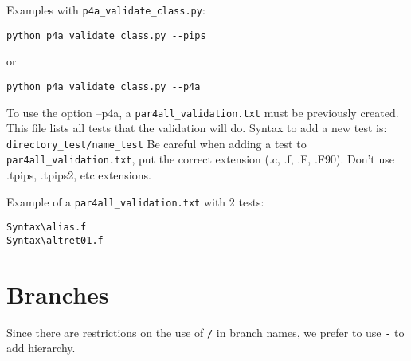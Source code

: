 \documentclass[a4paper]{article}
\begin{document}
Examples with \verb|p4a_validate_class.py|:
\begin{verbatim}
python p4a_validate_class.py --pips
\end{verbatim}
or
\begin{verbatim}
python p4a_validate_class.py --p4a
\end{verbatim}

To use the option --p4a, a  \verb|par4all_validation.txt| must be previously created. This file lists all tests that the validation will do.
Syntax to add a new test is: \verb|directory_test/name_test|
Be careful when adding a test to \verb|par4all_validation.txt|, put the correct extension (.c, .f, .F, .F90). Don't use .tpips, .tpips2, etc extensions.

Example of a \verb|par4all_validation.txt| with 2 tests:
\begin{verbatim}
Syntax\alias.f
Syntax\altret01.f
\end{verbatim}

\section{Branches}
\label{sec:branches}

Since there are restrictions on the use of \texttt{/} in branch names, we
prefer to use \texttt{-} to add hierarchy.
\end{document}
